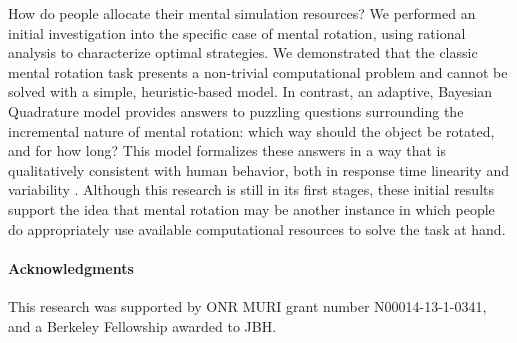 \documentclass{article} %
\begin{document}
How do people allocate their mental simulation resources?  We
performed an initial investigation into the specific case of mental
rotation, using rational analysis to characterize optimal strategies.
We demonstrated that the classic mental rotation task
\cite{Shepard1971} presents a non-trivial computational problem and
cannot be solved with a simple, heuristic-based model. In contrast, an
adaptive, Bayesian Quadrature model provides answers to puzzling
questions surrounding the incremental nature of mental rotation: which
way should the object be rotated, and for how long? This model
formalizes these answers in a way that is qualitatively consistent
with human behavior, both in response time linearity
\cite{Shepard1971} and variability \cite{Just1976}. Although this
research is still in its first stages, these initial results support
the idea that mental rotation may be another instance in which people
do appropriately use available computational resources to solve the
task at hand.

\paragraph{Acknowledgments} This research was supported by ONR MURI
grant number N00014-13-1-0341, and a Berkeley Fellowship awarded to
JBH.

\vfill


\renewcommand\refname{\normalsize{References}}

{\small }
\end{document}
